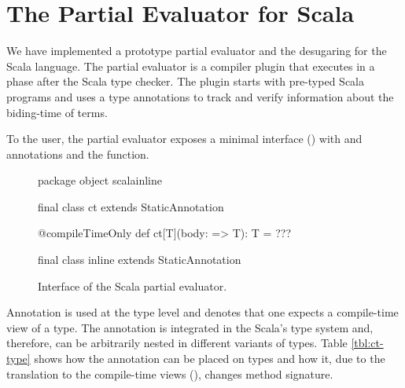 \section{The Partial Evaluator for Scala}
\label{sct:interface}

We have implemented a prototype partial evaluator  and
 the desugaring  for the Scala language. The partial evaluator
 is a compiler plugin that executes in a phase after the Scala type checker. The plugin starts
 with pre-typed Scala programs and uses a type annotations  to track and verify
 information about the biding-time of terms.

To the user, the partial evaluator exposes a minimal interface () with
 and  annotations and the  function.

\begin{figure}
\begin{listing}
package object scalainline {
  final class ct extends StaticAnnotation

  @compileTimeOnly def ct[T](body: => T): T = ???

  final class inline extends StaticAnnotation
}
\end{listing}
\label{fig:interface}
\caption{Interface of the Scala partial evaluator.}
\end{figure}

Annotation  is used at the type level and denotes that one expects a
 compile-time view of a type. The annotation is integrated in the Scala's type system
 and, therefore, can be arbitrarily nested in different variants of types. Table
 \ref{tbl:ct-type} shows how the  annotation can be placed on types
 and how it, due to the translation to the compile-time views (),
 changes method signature.

